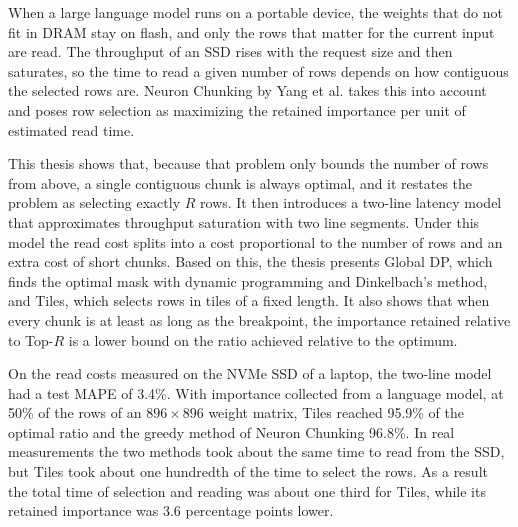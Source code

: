 \EnglishAbstractHeader

When a large language model runs on a portable device, the weights that do not fit in DRAM stay on flash, and only the rows that matter for the current input are read. The throughput of an SSD rises with the request size and then saturates, so the time to read a given number of rows depends on how contiguous the selected rows are. Neuron Chunking by Yang et al. takes this into account and poses row selection as maximizing the retained importance per unit of estimated read time.

This thesis shows that, because that problem only bounds the number of rows from above, a single contiguous chunk is always optimal, and it restates the problem as selecting exactly $R$ rows. It then introduces a two-line latency model that approximates throughput saturation with two line segments. Under this model the read cost splits into a cost proportional to the number of rows and an extra cost of short chunks. Based on this, the thesis presents Global DP, which finds the optimal mask with dynamic programming and Dinkelbach's method, and Tiles, which selects rows in tiles of a fixed length. It also shows that when every chunk is at least as long as the breakpoint, the importance retained relative to Top-$R$ is a lower bound on the ratio achieved relative to the optimum.

On the read costs measured on the NVMe SSD of a laptop, the two-line model had a test MAPE of 3.4\%. With importance collected from a language model, at 50\% of the rows of an $896\times896$ weight matrix, Tiles reached 95.9\% of the optimal ratio and the greedy method of Neuron Chunking 96.8\%. In real measurements the two methods took about the same time to read from the SSD, but Tiles took about one hundredth of the time to select the rows. As a result the total time of selection and reading was about one third for Tiles, while its retained importance was 3.6 percentage points lower.

